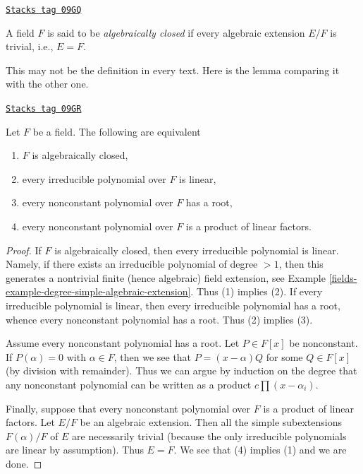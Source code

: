 \begin{definition}
\label{fields-definition-algebraically-closed}
\href{https://stacks.math.columbia.edu/tag/09GQ}{\texttt{Stacks tag 09GQ}}

A field $F$ is said to be {\it algebraically closed} if every algebraic
extension $E/F$ is trivial, i.e., $E = F$.
\end{definition}

This may not be the definition in every text. Here is the lemma comparing
it with the other one.

\begin{lemma}
\label{fields-lemma-algebraically-closed}
\href{https://stacks.math.columbia.edu/tag/09GR}{\texttt{Stacks tag 09GR}}

Let $F$ be a field. The following are equivalent
\begin{enumerate}
\item $F$ is algebraically closed,
\item every irreducible polynomial over $F$ is linear,
\item every nonconstant polynomial over $F$ has a root,
\item every nonconstant polynomial over $F$ is a product of linear factors.
\end{enumerate}
\end{lemma}

\begin{proof}

If $F$ is algebraically closed, then every irreducible polynomial is linear.
Namely, if there exists an irreducible polynomial of degree $> 1$, then
this generates a nontrivial finite (hence algebraic) field extension, see
Example \ref{fields-example-degree-simple-algebraic-extension}.
Thus (1) implies (2). If every irreducible polynomial
is linear, then every irreducible polynomial has a root, whence every
nonconstant polynomial has a root. Thus (2) implies (3).

\medskip\noindent
Assume every nonconstant polynomial has a root. Let $P \in F[x]$
be nonconstant. If $P(\alpha) = 0$ with $\alpha \in F$, then we see
that $P = (x - \alpha)Q$ for some $Q \in F[x]$ (by division with remainder).
Thus we can argue by induction on the degree that any nonconstant
polynomial can be written as a product $c \prod (x - \alpha_i)$.

\medskip\noindent
Finally, suppose that every nonconstant polynomial over $F$ is a product of
linear factors. Let $E/F$ be an algebraic extension. Then all the simple
subextensions $F(\alpha)/F$ of $E$ are necessarily trivial (because the
only irreducible polynomials are linear by assumption). Thus $E = F$.
We see that (4) implies (1) and we are done.
\end{proof}

